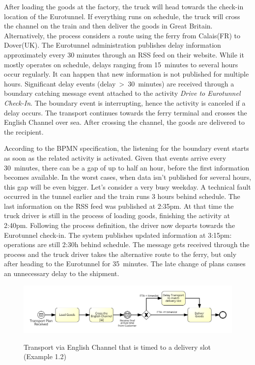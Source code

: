 After loading the goods at the factory, the truck will head towards the check-in location of the Eurotunnel.
If everything runs on schedule, the truck will cross the channel on the train and then deliver the goods in Great Britain.
Alternatively, the process considers a route using the ferry from Calais(FR) to Dover(UK).
The Eurotunnel administration publishes delay information approximately every 30 minutes through an RSS feed on their website. While it mostly operates on schedule, delays ranging from 15~minutes to several hours occur regularly. It can happen that new information is not published for multiple hours.
Significant delay events (delay~>~30~minutes) are received through a boundary catching message event attached to the activity \textit{Drive to Eurotunnel Check-In}. The boundary event is interrupting, hence the activity is canceled if a delay occurs.
The transport continues towards the ferry terminal and crosses the English Channel over sea. After crossing the channel, the goods are delivered to the recipient.

According to the BPMN specification, the listening for the boundary event starts as soon as the related activity is activated.
Given that events arrive every 30~minutes, there can be a gap of up to half an hour, before the first information becomes available.
In the worst cases, when data isn't published for several hours, this gap will be even bigger.
Let's consider a very busy weekday. A technical fault occurred in the tunnel earlier and the train runs 3 hours behind schedule.
The last information on the RSS feed was published at 2:35pm. At that time the truck driver is still in the process of loading goods, finishing the activity at 2:40pm.
Following the process definition, the driver now departs towards the Eurotunnel check-in.
The system publishes updated information at 3:15pm: operations are still 2:30h behind schedule. The message gets received through the process and the truck driver takes the alternative route to the ferry, but only after heading to the Eurotunnel for 35~minutes. The late change of plans causes an unnecessary delay to the shipment.

\begin{figure}[]
	\myfloatalign
	{\includegraphics[width=1\linewidth]{chapters/requirements/Eurotunnel_part2.png}}
	\caption{Transport via English Channel that is timed to a delivery slot (Example 1.2)}
	\label{fig:example-eurotunnel-part2}
\end{figure}

